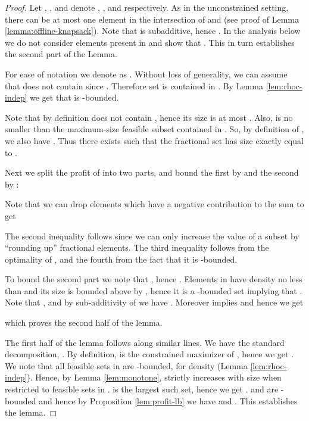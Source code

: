 \begin{proof}
Let , , and  denote , , and
 respectively. As in the unconstrained setting, there can
be at most one element in the intersection of  and  
(see proof of Lemma \ref{lemma:offline-knapsack}). Note that  is subadditive, hence
.  In the analysis below we do not consider elements
present in  and show that .  This in turn
establishes the second part of the Lemma.



For ease of notation we denote  as . Without loss of
generality, we can assume that  does not contain  since
.  Therefore set  is contained in . By Lemma \ref{lem:rhoc-indep} we get that  is
-bounded.

Note that by definition  does not contain , hence its size is
at most .  Also,  is no smaller than the
maximum-size feasible subset contained in . So, by definition of
, we also have . Thus there exists
 such that the fractional set  has size exactly equal to .





Next we split the profit of  into two parts, and bound the first
by  and the second by :

\noindent Note that we can drop elements which have a negative contribution to
the sum to get

The second inequality follows since we can only increase the value of
a subset by ``rounding up'' fractional elements. The third inequality
follows from the optimality of , and the fourth from the fact that
it is -bounded.

To bound the second part we note that , hence
. Elements in  have density
no less than  and its size is bounded above by
, hence it is a -bounded set implying that
.  Note that , and by sub-additivity of  we have . Moreover  implies
 and hence we get

which proves the second half of the lemma.

The first half of the lemma follows along similar lines. We 
have the standard decomposition, . By definition,  is the
constrained maximizer of , hence we get  
. We 
note that all feasible sets in  are -bounded, 
for density  (Lemma \ref{lem:rhoc-indep}). Hence, by Lemma \ref{lem:monotone},  strictly increases with size when restricted to feasible sets in .  is the largest such set, hence we get .  and  are -bounded and hence by Proposition \ref{lem:profit-lb} we have  and
. This establishes the lemma.
\end{proof}

